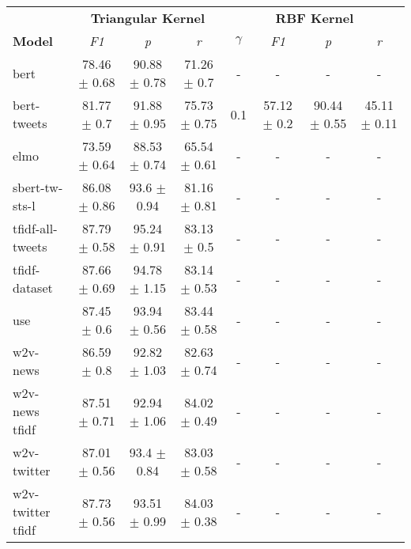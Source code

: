 \begin{tabular}{|l|ccc|cccc|}
\hline
                           &\multicolumn{3}{c}{\textbf{Triangular Kernel}}&\multicolumn{4}{|c|}{\textbf{RBF Kernel}}\\
\cline{2-8}
    \textbf{Model} &       \textit{F1} &        \textit{p} &        \textit{r} & $\gamma$ &      \textit{F1} &        \textit{p} &        \textit{r} \\
\hline
             bert  &  78.46 $\pm$ 0.68 &  90.88 $\pm$ 0.78 &   71.26 $\pm$ 0.7 &        - &                - &                 - &                 - \\
      bert-tweets  &   81.77 $\pm$ 0.7 &  91.88 $\pm$ 0.95 &  75.73 $\pm$ 0.75 &      0.1 &  57.12 $\pm$ 0.2 &  90.44 $\pm$ 0.55 &  45.11 $\pm$ 0.11 \\
             elmo  &  73.59 $\pm$ 0.64 &  88.53 $\pm$ 0.74 &  65.54 $\pm$ 0.61 &        - &                - &                 - &                 - \\
   sbert-tw-sts-l  &  86.08 $\pm$ 0.86 &   93.6 $\pm$ 0.94 &  81.16 $\pm$ 0.81 &        - &                - &                 - &                 - \\
 tfidf-all-tweets  &  87.79 $\pm$ 0.58 &  95.24 $\pm$ 0.91 &   83.13 $\pm$ 0.5 &        - &                - &                 - &                 - \\
    tfidf-dataset  &  87.66 $\pm$ 0.69 &  94.78 $\pm$ 1.15 &  83.14 $\pm$ 0.53 &        - &                - &                 - &                 - \\
              use  &   87.45 $\pm$ 0.6 &  93.94 $\pm$ 0.56 &  83.44 $\pm$ 0.58 &        - &                - &                 - &                 - \\
         w2v-news  &   86.59 $\pm$ 0.8 &  92.82 $\pm$ 1.03 &  82.63 $\pm$ 0.74 &        - &                - &                 - &                 - \\
    w2v-news tfidf &  87.51 $\pm$ 0.71 &  92.94 $\pm$ 1.06 &  84.02 $\pm$ 0.49 &        - &                - &                 - &                 - \\
      w2v-twitter  &  87.01 $\pm$ 0.56 &   93.4 $\pm$ 0.84 &  83.03 $\pm$ 0.58 &        - &                - &                 - &                 - \\
 w2v-twitter tfidf &  87.73 $\pm$ 0.56 &  93.51 $\pm$ 0.99 &  84.03 $\pm$ 0.38 &        - &                - &                 - &                 - \\
\hline
\end{tabular}
